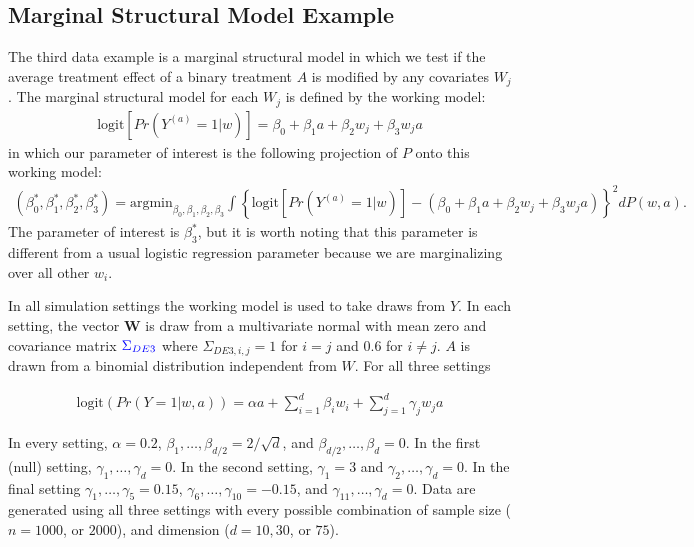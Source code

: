 \documentclass{article}
\begin{document}
\subsection{Marginal Structural Model Example}
\label{sec:msm_data}
The third data example is a marginal structural model in which we test if the average treatment effect of a binary treatment $A$ is modified by any covariates $W_j$.  The marginal structural model for each $W_j$ is defined by the working model:
\begin{align}
\text{logit}\left[Pr(Y^{(a)} = 1 | w)\right] = \beta_0 + \beta_1 a + \beta_2 w_j + \beta_3 w_j a \label{eqn:DE2param}
\end{align}
in which our parameter of interest is the following projection of $P$ onto this working model:
\begin{align*}
(\beta_0^*, \beta_1^*, \beta_2^*, \beta_3^*) = \text{argmin}_{\beta_0, \beta_1, \beta_2, \beta_3}\int\left\{\text{logit}\left[Pr\left(Y^{(a)} = 1 | w\right)\right] - (\beta_0 + \beta_1 a + \beta_2w_j + \beta_3 w_j a) \right\}^2 dP(w, a).
\end{align*}
The parameter of interest is $\beta_3^*$, but it is worth noting that this parameter is different from a usual logistic regression parameter because we are marginalizing over all other $w_i$.

In all simulation settings the working model is used to take draws from $Y$. In each setting, the vector $\boldsymbol{W}$ is draw from a multivariate normal with mean zero and covariance matrix $\textcolor{blue}{\Sigma_{DE3}}$ where $\Sigma_{DE3, i, j} = 1$ for $i = j$ and $0.6$ for $i \neq j$.  $A$ is drawn from a binomial distribution independent from $W$.  For all three settings 

\begin{align*}
	\text{logit}\left(Pr(Y = 1 | w, a)\right) = \alpha a + \sum_{i = 1}^{d} \beta_{i} w_i + \sum_{j = 1}^d \gamma_{j} w_j a
\end{align*}

In every setting, $\alpha = 0.2$, $\beta_1, \dots, \beta_{d/2} = 2/\sqrt{d}$, and $\beta_{d/2}, \dots, \beta_{d}  = 0$.  In the first (null) setting, $\gamma_{1}, \dots, \gamma_{d} = 0$.  In the second setting, $\gamma_{1} = 3$ and $\gamma_{2}, \dots, \gamma_{d} = 0$.  In the final setting $\gamma_{1}, \dots, \gamma_{5} = 0.15$, $\gamma_{6}, \dots, \gamma_{10} = -0.15$, and $\gamma_{11}, \dots, \gamma_{d} = 0$.
Data are generated using all three settings with every possible combination of sample size ($n = 1000$, or $2000$), and dimension ($d = 10, 30$, or $75$).
\end{document}
